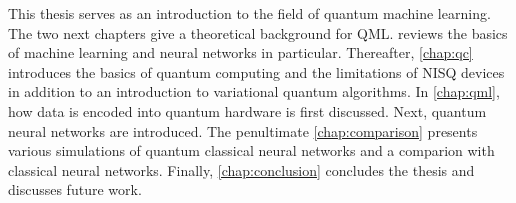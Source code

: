 This thesis serves as an introduction to the field of quantum machine learning.
The two next chapters give a theoretical background for QML.
 reviews the basics of machine learning and neural networks in particular.
Thereafter, \cref{chap:qc} introduces the basics of quantum computing and the limitations of NISQ devices in addition to an introduction to variational quantum algorithms.
In \cref{chap:qml}, how data is encoded into quantum hardware is first discussed. Next, quantum neural networks are introduced.
The penultimate \cref{chap:comparison} presents various simulations of quantum classical neural networks and a comparion with classical neural networks.
Finally, \cref{chap:conclusion} concludes the thesis and discusses future work.




